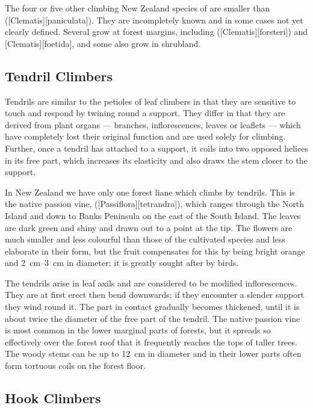The four or five other climbing New Zealand species of  are smaller than  ([Clematis][paniculata]).
They are incompletely known and in some cases not yet clearly defined.
Several grow at forest margins, including  ([Clematis][forsteri]) and [Clematis][foetida], and some also grow in shrubland.

\subsection{Tendril Climbers}

Tendrils are similar to the petioles of leaf climbers in that they are sensitive to touch and respond by twining round a support.
They differ in that they are derived from plant organs --- branches, inflorescences, leaves or leaflets --- which have completely lost their original function and are used solely for climbing.
Further, once a tendril has attached to a support, it coils into two opposed helices in its free part, which increases its elasticity and also draws the stem closer to the support.

In New Zealand we have only one forest liane which climbs by tendrils.
This is the native passion vine,  ([Passiflora][tetrandra]), which ranges through the North Island and down to Banks Peninsula on the east of the South Island.
The leaves are dark green and shiny and drawn out to a point at the tip.
The flowers are much smaller and less colourful than those of the cultivated species and less elaborate in their form, but the fruit compensates for this by being bright orange and \SIrange{2}{3}{\centi\metre} in diameter; it is greatly sought after by birds.

The tendrils arise in leaf axils and are considered to be modified inflorescences.
They are at first erect then bend downwards; if they encounter a slender support they wind round it.
The part in contact gradually becomes thickened, until it is about twice the diameter of the free part of the tendril.
The native passion vine is most common in the lower marginal parts of forests, but it spreads so effectively over the forest roof that it frequently reaches the tops of taller trees.
The woody stems can be up to \SI{12}{\centi\metre} in diameter and in their lower parts often form tortuous coils on the forest floor.

\subsection{Hook Climbers}

